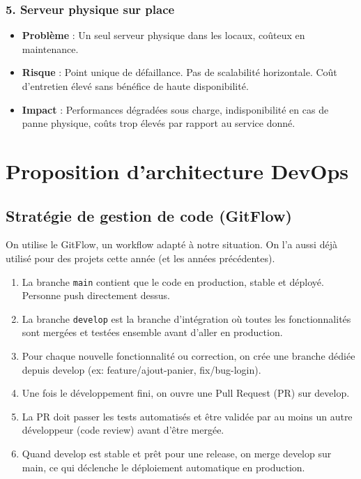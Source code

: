 \documentclass{article}
\begin{document}
\subsubsection{5. Serveur physique sur place}
\begin{itemize}
    \item \textbf{Problème} : Un seul serveur physique dans les locaux, coûteux en maintenance.
    \item \textbf{Risque} : Point unique de défaillance. Pas de scalabilité horizontale. Coût d'entretien élevé sans bénéfice de haute disponibilité.
    \item \textbf{Impact} : Performances dégradées sous charge, indisponibilité en cas de panne physique, coûts trop élevés par rapport au service donné.
\end{itemize}

\section{Proposition d'architecture DevOps}

\subsection{Stratégie de gestion de code (GitFlow)}

On utilise le GitFlow, un workflow adapté à notre situation. On l'a aussi déjà utilisé pour des projets cette année (et les années précédentes).

\begin{enumerate}
    \item La branche \texttt{main} contient que le code en production, stable et déployé. Personne push directement dessus.
    \item La branche \texttt{develop} est la branche d'intégration où toutes les fonctionnalités sont mergées et testées ensemble avant d'aller en production.
    \item Pour chaque nouvelle fonctionnalité ou correction, on crée une branche dédiée depuis develop (ex: feature/ajout-panier, fix/bug-login).
    \item Une fois le développement fini, on ouvre une Pull Request (PR) sur develop.
    \item La PR doit passer les tests automatisés et être validée par au moins un autre développeur (code review) avant d'être mergée.
    \item Quand develop est stable et prêt pour une release, on merge develop sur main, ce qui déclenche le déploiement automatique en production.
\end{enumerate}
\end{document}
